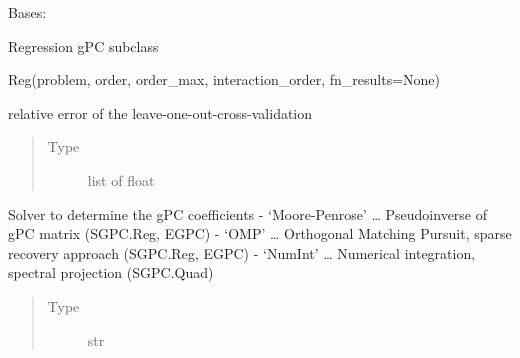 \documentclass[letterpaper,10pt,english,openany,oneside]{sphinxmanual}
\begin{document}
\begin{fulllineitems}
\label{\detokenize{pygpc:pygpc.SGPC.Reg}}
Bases: {\hyperref[\detokenize{pygpc:pygpc.SGPC.SGPC}]{}}

Regression gPC subclass

Reg(problem, order, order\_max, interaction\_order, fn\_results=None)

\begin{fulllineitems}
\label{\detokenize{pygpc:pygpc.SGPC.Reg.relative_error_loocv}}
relative error of the leave-one-out-cross-validation
\begin{quote}\begin{description}
\item[{Type}] \leavevmode
list of float

\end{description}\end{quote}

\end{fulllineitems}


\begin{fulllineitems}
\label{\detokenize{pygpc:pygpc.SGPC.Reg.solver}}
Solver to determine the gPC coefficients
- ‘Moore-Penrose’ … Pseudoinverse of gPC matrix (SGPC.Reg, EGPC)
- ‘OMP’ … Orthogonal Matching Pursuit, sparse recovery approach (SGPC.Reg, EGPC)
- ‘NumInt’ … Numerical integration, spectral projection (SGPC.Quad)
\begin{quote}\begin{description}
\item[{Type}] \leavevmode
str

\end{description}\end{quote}

\end{fulllineitems}


\end{fulllineitems}
\end{document}
